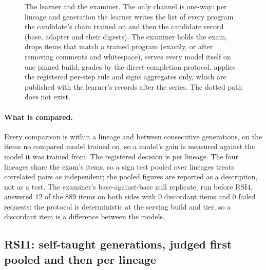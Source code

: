 \begin{figure}[tbp]
\caption{The learner and the examiner. The only channel is one-way: per lineage and
generation the learner writes the list of every program the candidate's chain trained on and then the
candidate record (base, adapter and their digests). The examiner holds the exam, drops items that
match a trained program (exactly, or after removing comments and whitespace), serves every model itself
on one pinned build, grades by the direct-completion protocol, applies the registered per-step rule
and signs aggregates only, which are published with the learner's records after the series. The
dotted path does not exist.}\label{fig:examiner}
\end{figure}

\paragraph{What is compared.} Every comparison is within a lineage and between consecutive
generations, on the items no compared model trained on, so a model's gain is measured against the
model it was trained from. The registered decision is per lineage. The four lineages share the exam's
items, so a sign test pooled over lineages treats correlated pairs as independent; the pooled figures
are reported as a description, not as a test. The examiner's base-against-base null replicate, run before RSI4, answered
12 of the 889 items on both sides with 0 discordant items and 0 failed requests: the protocol is
deterministic at the serving build and tier, so a discordant item is a difference between the
models.

\subsection{RSI1: self-taught generations, judged first pooled and then per lineage}\label{sec:rsi1}

